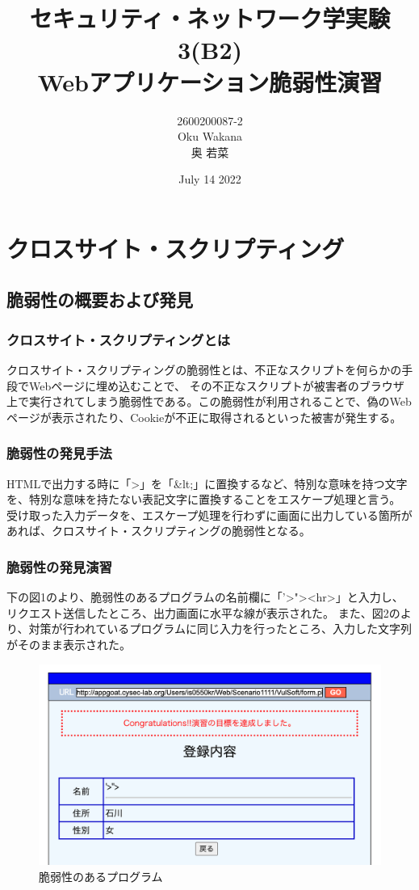 \documentclass[dvipdfmx,autodetect-engine,titlepage]{jsarticle}
\title{セキュリティ・ネットワーク学実験3(B2)\\
Webアプリケーション脆弱性演習\\
}
\author{2600200087-2\\Oku Wakana\\奥 若菜}
\date{July 14 2022}
\begin{document}
\maketitle

\section{クロスサイト・スクリプティング}
\subsection{脆弱性の概要および発見}
\subsubsection{クロスサイト・スクリプティングとは}
クロスサイト・スクリプティングの脆弱性とは、不正なスクリプトを何らかの手段でWebページに埋め込むことで、
その不正なスクリプトが被害者のブラウザ上で実行されてしまう脆弱性である。この脆弱性が利用されることで、偽のWebページが表示されたり、Cookieが不正に取得されるといった被害が発生する。\\
\subsubsection{脆弱性の発見手法}
HTMLで出力する時に「\textgreater」を「\&lt;」に置換するなど、特別な意味を持つ文字を、特別な意味を持たない表記文字に置換することをエスケープ処理と言う。
受け取った入力データを、エスケープ処理を行わずに画面に出力している箇所があれば、クロスサイト・スクリプティングの脆弱性となる。\\

\subsubsection{脆弱性の発見演習}
下の図1のより、脆弱性のあるプログラムの名前欄に「'\textgreater "\textgreater \textless hr\textgreater」と入力し、リクエスト送信したところ、出力画面に水平な線が表示された。
また、図2のより、対策が行われているプログラムに同じ入力を行ったところ、入力した文字列がそのまま表示された。\\
\begin{figure}[H]
  \centering
  \includegraphics[scale=0.35]{web2.png}
  \caption{脆弱性のあるプログラム}\label{fig:図2}
\end{figure}
\end{document}
